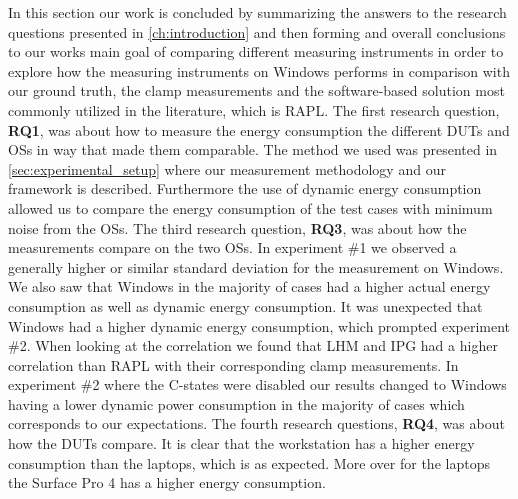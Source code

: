 
In this section our work is concluded by summarizing the answers to the research questions presented in \cref{ch:introduction} and then forming and overall conclusions to our works main goal of comparing different measuring instruments in order to explore how the measuring instruments on Windows performs in comparison with our ground truth, the clamp measurements and the software-based solution most commonly utilized in the literature, which is RAPL. The first research question, \textbf{RQ1}, was about how to measure the energy consumption the different DUTs and OSs in way that made them comparable. The method we used was presented in \cref{sec:experimental_setup} where our measurement methodology and our framework is described. Furthermore the use of dynamic energy consumption allowed us to compare the energy consumption of the test cases with minimum noise from the OSs. The third research question, \textbf{RQ3}, was about how the measurements compare on the two OSs. In experiment \#1 we observed a generally higher or similar standard deviation for the measurement on Windows. We also saw that Windows in the majority of cases had a higher actual energy consumption as well as dynamic energy consumption. It was unexpected that Windows had a higher dynamic energy consumption, which prompted experiment \#2. When looking at the correlation we found that LHM and IPG had a higher correlation than RAPL with their corresponding clamp measurements. In experiment \#2 where the C-states were disabled our results changed to Windows having a lower dynamic power consumption in the majority of cases which corresponds to our expectations.
The fourth research questions, \textbf{RQ4}, was about how the DUTs compare. It is clear that the workstation has a higher energy consumption than the laptops, which is as expected. More over for the laptops the Surface Pro 4 has a higher energy consumption. 
